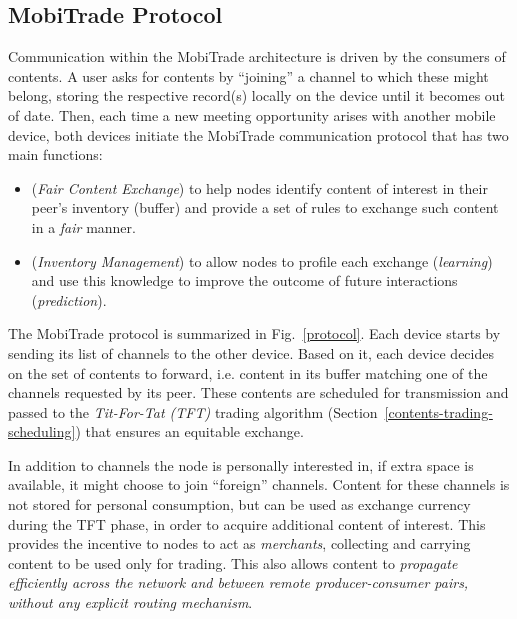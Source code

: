 \subsection{MobiTrade Protocol}
\label{communication-protocol}

Communication within the MobiTrade architecture is driven by the consumers of contents. A user asks for contents by ``joining'' a channel to which these might belong, storing the respective record(s) locally on the device until it becomes out of date. Then, each time a new meeting opportunity arises with another mobile device, both devices initiate the MobiTrade communication protocol that has two main functions:
\begin{itemize}
\item (\emph{Fair Content Exchange}) to help nodes identify content of interest in their peer's inventory (buffer) and provide a set of rules to exchange such content in a \emph{fair} manner.
\item (\emph{Inventory Management}) to allow nodes to profile each exchange (\emph{learning}) and use this knowledge to improve the outcome of future interactions (\emph{prediction}).
\end{itemize}

The MobiTrade protocol is summarized in Fig.~\ref{protocol}. Each device starts by sending its list of channels to the other device. Based on it, each device decides on the set of contents to forward, i.e. content in its buffer matching one of the channels requested by its peer. These contents are scheduled for transmission and passed to the \emph{Tit-For-Tat (TFT)} trading algorithm (Section~\ref{contents-trading-scheduling}) that ensures an equitable exchange.

In addition to channels the node is personally interested in, if extra space is available, it might choose to join ``foreign'' channels. Content for these channels is not stored for personal consumption, but can be used as exchange currency during the TFT phase, in order to acquire additional content of interest. This provides the incentive to nodes to act as \emph{merchants}, collecting and carrying content to be used only for trading. This also allows content to \emph{propagate efficiently across the network and between remote producer-consumer pairs, without any explicit routing mechanism}. %

